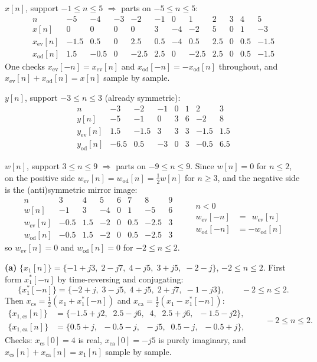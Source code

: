 \textbf{$x[n]$}, support $-1\le n\le 5$ $\Rightarrow$ parts on $-5\le n\le 5$:
\[
\begin{array}{r|rrrrrrrrrrr}
n & -5 & -4 & -3 & -2 & -1 & 0 & 1 & 2 & 3 & 4 & 5\\\hline
x[n] & 0&0&0&0&3&-4&-2&5&0&1&-3\\
x_{\mathrm{ev}}[n] & -1.5&0.5&0&2.5&0.5&-4&0.5&2.5&0&0.5&-1.5\\
x_{\mathrm{od}}[n] & 1.5&-0.5&0&-2.5&2.5&0&-2.5&2.5&0&0.5&-1.5
\end{array}
\]
One checks $x_{\mathrm{ev}}[-n]=x_{\mathrm{ev}}[n]$ and $x_{\mathrm{od}}[-n]=-x_{\mathrm{od}}[n]$
throughout, and $x_{\mathrm{ev}}[n]+x_{\mathrm{od}}[n]=x[n]$ sample by sample.

\textbf{$y[n]$}, support $-3\le n\le 3$ (already symmetric):
\[
\begin{array}{r|rrrrrrr}
n & -3 & -2 & -1 & 0 & 1 & 2 & 3\\\hline
y[n] & -5&-1&0&3&6&-2&8\\
y_{\mathrm{ev}}[n] & 1.5&-1.5&3&3&3&-1.5&1.5\\
y_{\mathrm{od}}[n] & -6.5&0.5&-3&0&3&-0.5&6.5
\end{array}
\]

\textbf{$w[n]$}, support $3\le n\le 9$ $\Rightarrow$ parts on $-9\le n\le 9$. Since
$w[n]=0$ for $n\le 2$, on the positive side $w_{\mathrm{ev}}[n]=w_{\mathrm{od}}[n]=\tfrac12 w[n]$
for $n\ge 3$, and the negative side is the (anti)symmetric mirror image:
\[
\begin{array}{r|rrrrrrr}
n & 3 & 4 & 5 & 6 & 7 & 8 & 9\\\hline
w[n] & -1&3&-4&0&1&-5&6\\
w_{\mathrm{ev}}[n] & -0.5&1.5&-2&0&0.5&-2.5&3\\
w_{\mathrm{od}}[n] & -0.5&1.5&-2&0&0.5&-2.5&3
\end{array}
\qquad
\begin{array}{r|r}
n<0 & \\\hline
w_{\mathrm{ev}}[-n] & =\ \ w_{\mathrm{ev}}[n]\\
w_{\mathrm{od}}[-n] & =-w_{\mathrm{od}}[n]
\end{array}
\]
so $w_{\mathrm{ev}}[n]=0$ and $w_{\mathrm{od}}[n]=0$ for $-2\le n\le 2$.


\textbf{(a)} $\{x_1[n]\}=\{-1+j3,\;2-j7,\;4-j5,\;3+j5,\;-2-j\}$, $-2\le n\le 2$.
First form $x_1^*[-n]$ by time-reversing and conjugating:
\[
\{x_1^*[-n]\}=\{-2+j,\;3-j5,\;4+j5,\;2+j7,\;-1-j3\},\qquad -2\le n\le 2 .
\]
Then $x_{\mathrm{cs}}=\tfrac12(x_1+x_1^*[-n])$ and $x_{\mathrm{ca}}=\tfrac12(x_1-x_1^*[-n])$:
\[
\boxed{
\begin{aligned}
\{x_{1,\mathrm{cs}}[n]\}&=\{-1.5+j2,\;\;2.5-j6,\;\;4,\;\;2.5+j6,\;\;-1.5-j2\},\\
\{x_{1,\mathrm{ca}}[n]\}&=\{0.5+j,\;\;-0.5-j,\;\;-j5,\;\;0.5-j,\;\;-0.5+j\},
\end{aligned}\qquad -2\le n\le 2 .}
\]
Checks: $x_{\mathrm{cs}}[0]=4$ is real, $x_{\mathrm{ca}}[0]=-j5$ is purely imaginary, and
$x_{\mathrm{cs}}[n]+x_{\mathrm{ca}}[n]=x_1[n]$ sample by sample.

